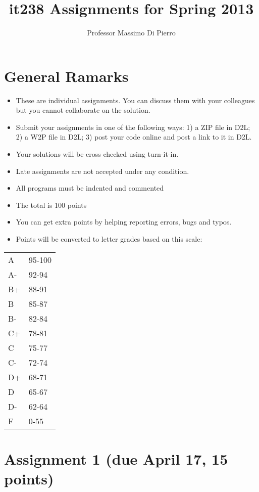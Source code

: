 \documentclass[12pt]{article}
\title{it238 Assignments for Spring 2013}
\author{Professor Massimo Di Pierro}
\begin{document}
\maketitle

\section*{General Ramarks}

\begin{itemize}
\item These are individual assignments. You can discuss them with your colleagues but you cannot collaborate on the solution.
\item Submit your assignments in one of the following ways: 1) a ZIP file in D2L; 2) a W2P file in D2L; 3) post your code online and post a link to it in D2L.
\item Your solutions will be cross checked using turn-it-in.
\item Late assignments are not accepted under any condition.
\item All programs must be indented and commented
\item The total is 100 points
\item You can get extra points by helping reporting errors, bugs and typos.
\item Points will be converted to letter grades based on this scale:
\end{itemize}

\begin{tabular}{ll} \hline
  A & 95-100 \\
  A- & 92-94 \\
  B+ & 88-91 \\
  B  & 85-87 \\
  B- & 82-84 \\
  C+ & 78-81 \\
  C & 75-77 \\
  C- & 72-74 \\
  D+ & 68-71 \\
  D & 65-67 \\
  D- & 62-64 \\
  F & 0-55  \\ \hline
\end{tabular}

\section{Assignment 1 (due April 17, 15 points)}
\end{document}
